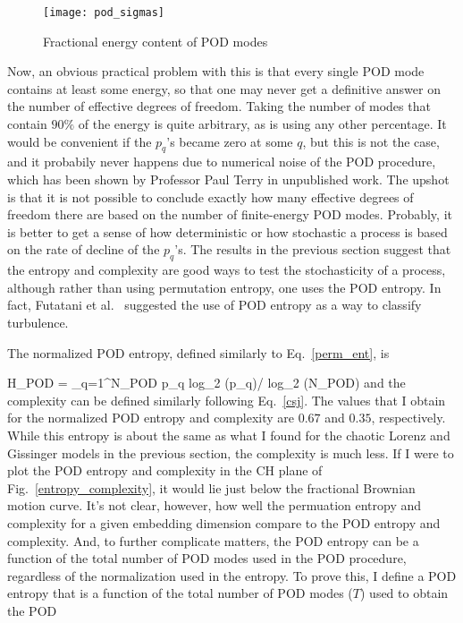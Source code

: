 \begin{figure}[!ht]
\centerline{\texttt{[image: pod\_sigmas]}}
\caption{Fractional energy content of POD modes}
\label{pod_sigmas}
\end{figure}

Now, an obvious practical problem with this is that every single POD mode contains at least some energy, so that one may never get a definitive answer on the number of effective degrees of freedom. 
Taking the number of modes that contain $90\%$ of the energy is quite arbitrary, as is using any other percentage. It would be convenient if the $p_q$'s became zero at some $q$, but this is not
the case, and it probabily never happens due to numerical noise of the POD procedure, which has been shown by Professor Paul Terry in unpublished work. The upshot
is that it is not possible to conclude exactly how many effective degrees of freedom there are based on the number of finite-energy POD modes. Probably, it is better to get a sense of how
deterministic or how stochastic a process is based on the rate of decline of the $p_q$'s. The results in the previous section suggest that the entropy and complexity are good ways
to test the stochasticity of a process, although rather than using permutation entropy, one uses the POD entropy. In fact, Futatani et al.~\cite{futatani2009} suggested the use of POD entropy as a way
to classify turbulence.

The normalized POD entropy, defined similarly to Eq.~\ref{perm_ent}, is

\beq
H_{{\rm{POD}}} = \sum_{q=1}^{N_{{\rm{POD}}}} p_q {\rm{log}}_2 (p_q)/ {\rm{log}}_2 (N_{{\rm{POD}}})
\eeq
and the complexity can be defined similarly following Eq.~\ref{csj}. The values that I obtain for the normalized POD entropy and complexity are $0.67$ and $0.35$, respectively. While this entropy
is about the same as what I found for the chaotic Lorenz and Gissinger models in the previous section, the complexity is much less. If I were to plot the POD entropy and complexity in the CH plane
of Fig.~\ref{entropy_complexity}, it would lie just below the fractional Brownian motion curve. It's not clear, however, how well the permuation entropy and complexity for a given embedding
dimension compare to the POD entropy and complexity. And, to further complicate matters, the POD entropy can be a function of the total number of POD modes used in the POD procedure, 
regardless of the normalization used in the entropy. To prove this, I define a POD entropy that is a function of the total number of POD modes ($T$) used to obtain the POD

